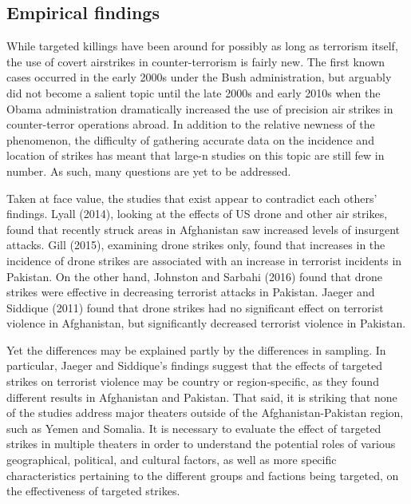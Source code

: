 \documentclass[letterpaper,12pt]{article}
\theoremstyle{definition}
\begin{document}
\subsection{Empirical findings}

While targeted killings have been around for possibly as long as terrorism itself, the use of covert airstrikes in counter-terrorism is fairly new. The first known cases occurred in the early 2000s under the Bush administration, but arguably did not become a salient topic until the late 2000s and early 2010s when the Obama administration dramatically increased the use of precision air strikes in counter-terror operations abroad. In addition to the relative newness of the phenomenon, the difficulty of gathering accurate data on the incidence and location of strikes has meant that large-n studies on this topic are still few in number. As such, many questions are yet to be addressed.

Taken at face value, the studies that exist appear to contradict each others' findings. Lyall (2014), looking at the effects of US drone and other air strikes, found that recently struck areas in Afghanistan saw increased levels of insurgent attacks. Gill (2015), examining drone strikes only, found that increases in the incidence of drone strikes are associated with an increase in terrorist incidents in Pakistan. On the other hand, Johnston and Sarbahi (2016) found that drone strikes were effective in decreasing terrorist attacks in Pakistan. Jaeger and Siddique (2011) found that drone strikes had no significant effect on terrorist violence in Afghanistan, but significantly decreased terrorist violence in Pakistan.

Yet the differences may be explained partly by the differences in sampling. In particular, Jaeger and Siddique's findings suggest that the effects of targeted strikes on terrorist violence may be country or region-specific, as they found different results in Afghanistan and Pakistan. That said, it is striking that none of the studies address major theaters outside of the Afghanistan-Pakistan region, such as Yemen and Somalia. It is necessary to evaluate the effect of targeted strikes in multiple theaters in order to understand the potential roles of various geographical, political, and cultural factors, as well as more specific characteristics pertaining to the different groups and factions being targeted, on the effectiveness of targeted strikes. 
\end{document}
